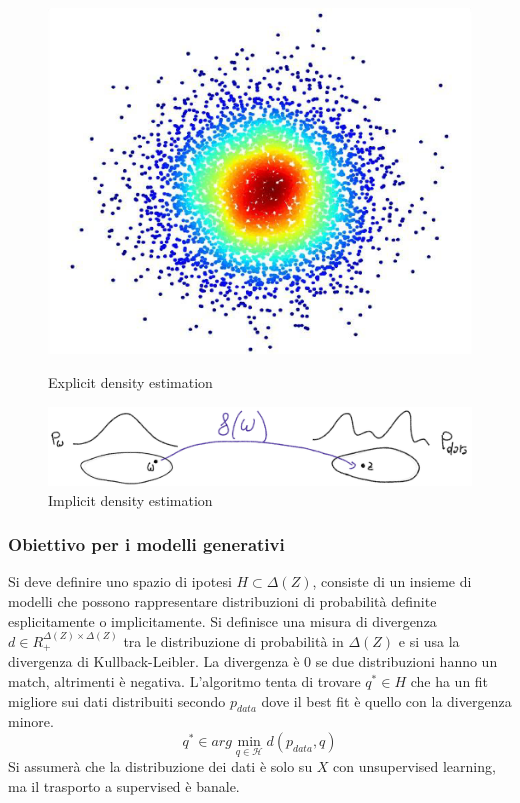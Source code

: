 \begin{figure}
	\centering
	\begin{minipage}{.5\textwidth}
		\centering
		\includegraphics[width=0.7\linewidth]{imgs/chapter12/img18}
		\caption{Explicit density estimation}
		\label{fig:chapter12-18}
	\end{minipage}%
	\begin{minipage}{.5\textwidth}
		\centering
		\includegraphics[width=1\linewidth]{imgs/chapter12/img19}
		\caption{Implicit density estimation}
		\label{fig:chapter12-19}
	\end{minipage}
\end{figure}


\subsubsection{Obiettivo per i modelli generativi}
Si deve definire uno spazio di ipotesi $H\subset \Delta(Z)$, consiste di un insieme di modelli che possono rappresentare distribuzioni di probabilit\`a definite esplicitamente o implicitamente.
Si definisce una misura di divergenza $d\in R_+^{\Delta(Z)\times\Delta(Z)}$ tra le distribuzione di probabilit\`a in $\Delta(Z)$ e si usa la divergenza di Kullback-Leibler.
La divergenza \`e $0$ se due distribuzioni hanno un match, altrimenti \`e negativa.
L'algoritmo tenta di trovare $q^*\in H$ che ha un fit migliore sui dati distribuiti secondo $p_{data}$ dove il best fit \`e quello con la divergenza minore.
$$q^*\in arg\min\limits_{q\in\mathcal{H}}d(p_{data},q)$$
Si assumer\`a che la distribuzione dei dati \`e solo su $X$ con unsupervised learning, ma il trasporto a supervised \`e banale.


